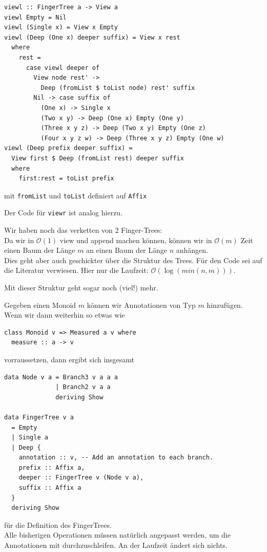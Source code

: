 \documentclass{beamer}
\begin{document}
\begin{frame}[fragile]
\begin{verbatim}
viewl :: FingerTree a -> View a
viewl Empty = Nil              
viewl (Single x) = View x Empty
viewl (Deep (One x) deeper suffix) = View x rest
  where
    rest =
      case viewl deeper of
        View node rest' ->
          Deep (fromList $ toList node) rest' suffix
        Nil -> case suffix of
          (One x) -> Single x
          (Two x y) -> Deep (One x) Empty (One y)
          (Three x y z) -> Deep (Two x y) Empty (One z)
          (Four x y z w) -> Deep (Three x y z) Empty (One w)
viewl (Deep prefix deeper suffix) =
  View first $ Deep (fromList rest) deeper suffix
  where
    first:rest = toList prefix
\end{verbatim}
mit \texttt{fromList} und \texttt{toList} definiert auf \texttt{Affix}
\end{frame}

\begin{frame}
Der Code für \texttt{viewr} ist analog hierzu.\\\par\pause
Wir haben noch das verketten von 2 Finger-Trees:\\
Da wir in $\mathcal{O}(1)$ view und append machen können, können wir in $\mathcal{O}(m)$ Zeit einen Baum der Länge $m$ an einen Baum der Länge $n$ anhängen.\\\pause
\bigskip
Dies geht aber auch geschickter über die Struktur des Trees. Für den Code sei auf die Literatur verwiesen. Hier nur die Laufzeit: $\mathcal{O}(\log (min(n,m)))$.
\end{frame}

\begin{frame}[fragile]
Mit dieser Struktur geht sogar noch (viel!) mehr.\\\par\pause
Gegeben einen Monoid $m$ können wir Annotationen von Typ $m$ hinzufügen.\\\pause
Wenn wir dann weiterhin so etwas wie
\begin{verbatim}
class Monoid v => Measured a v where
  measure :: a -> v
\end{verbatim}
vorraussetzen, dann ergibt sich insgesamt
\end{frame}

\begin{frame}[fragile]
\begin{verbatim}
data Node v a = Branch3 v a a a
              | Branch2 v a a
              deriving Show
            
data FingerTree v a 
  = Empty
  | Single a
  | Deep {
    annotation :: v, -- Add an annotation to each branch.
    prefix :: Affix a,
    deeper :: FingerTree v (Node v a),
    suffix :: Affix a
  }
  deriving Show
\end{verbatim}
für die Definition des FingerTrees.\\\pause
Alle bisherigen Operationen müssen natürlich angepasst werden, um die Annotationen mit durchzuschleifen. An der Laufzeit ändert sich nichts.
\end{frame}
\end{document}
